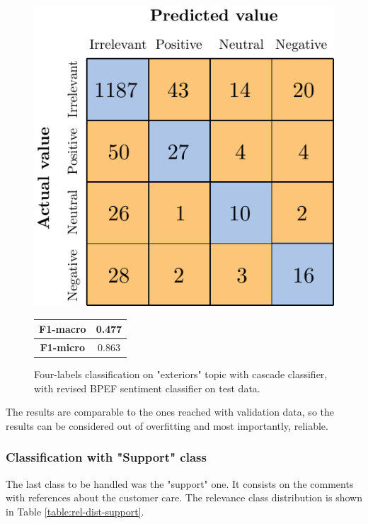 \begin{figure}[H]
	\begin{minipage}[b]{0.6\linewidth}
		\centering
		\includegraphics[scale=1]{figures/conf_matrices/ita_exteriors/ita_cascade_exteriors_bpef_tst.pdf}
	\end{minipage}
	\begin{minipage}[b]{0.3\linewidth}
		\begin{tabular}[b]{ | c | c | } 
			\hline
			\textbf{F1-macro} & 0.477 \\
			\hline
			\textbf{F1-micro} & 0.863 \\ 
			\hline
		\end{tabular}
	\end{minipage}
	\caption{Four-labels classification on "exteriors" topic with cascade classifier, with revised BPEF sentiment classifier on test data.}
	\label{fig:ita_cascade_exteriors_bpef_tst}
\end{figure}


The results are comparable to the ones reached with validation data, so the results can be considered out of overfitting and most importantly, reliable.

\subsubsection{Classification with "Support" class}

The last class to be handled was the "support" one. It consists on the comments with references about the customer care. The relevance class distribution is shown in Table \ref{table:rel-dist-support}. 

